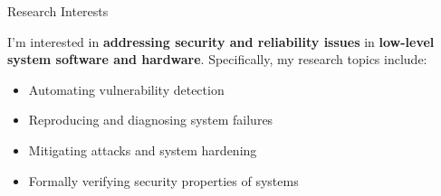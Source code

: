 \begin{rSection}{Research Interests}
\newcommand{\eg}{\textit{e}.\textit{g}.\xspace}

I'm interested in \textbf{addressing security and reliability issues}
in \textbf{low-level system software and hardware}. Specifically, my
research topics include:

\begin{itemize}[leftmargin=*,itemsep=-5pt]
\item{Automating vulnerability detection}
\item{Reproducing and diagnosing system failures}
\item{Mitigating attacks and system hardening}
\item{Formally verifying security properties of systems}
\end{itemize}


\end{rSection}

